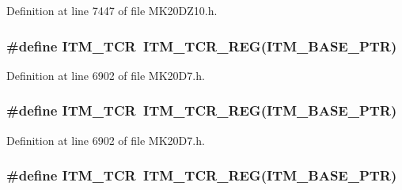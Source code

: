 Definition at line 7447 of file M\+K20\+D\+Z10.\+h.

\subsubsection[{\texorpdfstring{I\+T\+M\+\_\+\+T\+CR}{ITM_TCR}}]{\setlength{\rightskip}{0pt plus 5cm}\#define I\+T\+M\+\_\+\+T\+CR~{\bf I\+T\+M\+\_\+\+T\+C\+R\+\_\+\+R\+EG}({\bf I\+T\+M\+\_\+\+B\+A\+S\+E\+\_\+\+P\+TR})}\hypertarget{group___i_t_m___register___accessor___macros_ga935f0be267215442b7cffb0a191c7223}{}\label{group___i_t_m___register___accessor___macros_ga935f0be267215442b7cffb0a191c7223}


Definition at line 6902 of file M\+K20\+D7.\+h.

\subsubsection[{\texorpdfstring{I\+T\+M\+\_\+\+T\+CR}{ITM_TCR}}]{\setlength{\rightskip}{0pt plus 5cm}\#define I\+T\+M\+\_\+\+T\+CR~{\bf I\+T\+M\+\_\+\+T\+C\+R\+\_\+\+R\+EG}({\bf I\+T\+M\+\_\+\+B\+A\+S\+E\+\_\+\+P\+TR})}\hypertarget{group___i_t_m___register___accessor___macros_ga935f0be267215442b7cffb0a191c7223}{}\label{group___i_t_m___register___accessor___macros_ga935f0be267215442b7cffb0a191c7223}


Definition at line 6902 of file M\+K20\+D7.\+h.

\subsubsection[{\texorpdfstring{I\+T\+M\+\_\+\+T\+CR}{ITM_TCR}}]{\setlength{\rightskip}{0pt plus 5cm}\#define I\+T\+M\+\_\+\+T\+CR~{\bf I\+T\+M\+\_\+\+T\+C\+R\+\_\+\+R\+EG}({\bf I\+T\+M\+\_\+\+B\+A\+S\+E\+\_\+\+P\+TR})}\hypertarget{group___i_t_m___register___accessor___macros_ga935f0be267215442b7cffb0a191c7223}{}\label{group___i_t_m___register___accessor___macros_ga935f0be267215442b7cffb0a191c7223}


